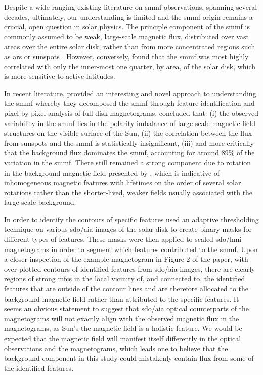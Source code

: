 Despite a wide-ranging existing literature on \gls{smmf} observations, spanning several decades, ultimately, our understanding is limited and the \gls{smmf} origin remains a crucial, open question in solar physics. The principle component of the \gls{smmf} is commonly assumed to be weak, large-scale magnetic flux, distributed over vast areas over the entire solar disk, rather than from more concentrated regions such as \glspl{ar} or sunspots \citep{severny_time_1971, scherrer_mean_1977, xiang_ensemble_2016}. However, conversely, \citet{scherrer_mean_1972} found that the \gls{smmf} was most highly correlated with only the inner-most one quarter, by area, of the solar disk, which is more sensitive to active latitudes.

In recent literature, \citet{bose_variability_2018} provided an interesting and novel approach to understanding the \gls{smmf} whereby they decomposed the \gls{smmf} through feature identification and pixel-by-pixel analysis of full-disk magnetograms. \citet{bose_variability_2018} concluded that: (i) the observed variability in the \gls{smmf} lies in the polarity imbalance of large-scale magnetic field structures on the visible surface of the Sun, (ii) the correlation between the flux from sunspots and the \gls{smmf} is statistically insignificant, (iii) and more critically that the background flux dominates the \gls{smmf}, accounting for around $89 \%$ of the variation in the \gls{smmf}. There still remained a strong component due to rotation in the background magnetic field presented by \citet{bose_variability_2018}, which is indicative of inhomogeneous magnetic features with lifetimes on the order of several solar rotations rather than the shorter-lived, weaker fields usually associated with the large-scale background. 

In order to identify the contours of specific features \citet{bose_variability_2018} used an adaptive thresholding technique on various \gls{sdo/aia} images of the solar disk to create binary masks for different types of features. These masks were then applied to scaled \gls{sdo/hmi} magnetograms in order to segment which features contributed to the \gls{smmf}. Upon a closer inspection of the example magnetogram in Figure 2 of the paper, with over-plotted contours of identified features from \gls{sdo/aia} images, there are clearly regions of strong \glspl{mfc} in the local vicinity of, and connected to, the identified features that are outside of the contour lines and are therefore allocated to the background magnetic field rather than attributed to the specific features. It seems an obvious statement to suggest that \gls{sdo/aia} optical counterparts of the magnetograms will not exactly align with the observed magnetic flux in the magnetograms, as Sun's the magnetic field is a holistic feature. We would be expected that the magnetic field will manifest itself differently in the optical observations and the magnetograms, which leads one to believe that the background component in this study could mistakenly contain flux from some of the identified features.

